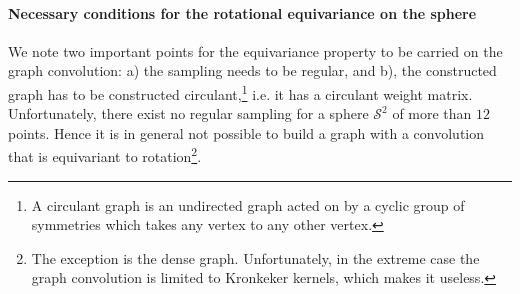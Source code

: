 \documentclass{article} %
\newcommand{\figref}[1]{Figure~\ref{fig:#1}}
\newcommand{\secref}[1]{Section~\ref{sec:#1}}
\newcommand{\eqnref}[1]{(\ref{eqn:#1})}
\renewcommand{\b}[1]{{\bm{#1}}}   %
\newcommand{\1}{\b{1}}              %
\newcommand{\0}{\b{0}}              %
\renewcommand{\L}{\b{L}}
\newcommand{\T}{\mathcal{T}}
\begin{document}
\paragraph{Necessary conditions for the rotational equivariance on the sphere}
We note two important points for the equivariance property to be carried on the graph convolution: a) the sampling needs to be regular, and b), the constructed graph has to be constructed circulant,\footnote{A circulant graph is an undirected graph acted on by a cyclic group of symmetries which takes any vertex to any other vertex.} i.e. it has a circulant weight matrix.
Unfortunately, there exist no regular sampling for a sphere $\mathcal{S}^2$ of more than $12$ points. Hence it is in general not possible to build a graph with a convolution that is equivariant to rotation\footnote{The exception is the dense graph. Unfortunately, in the extreme case the graph convolution is limited to Kronkeker kernels, which makes it useless.}. 





\end{document}
